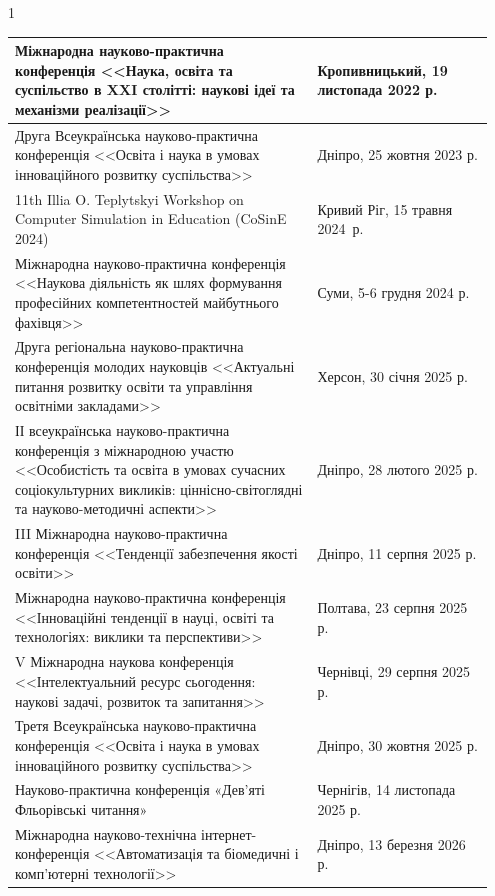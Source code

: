 \begin{center}
\begin{spacing}{1}
\begin{longtable}{|p{0.6\linewidth}|p{0.35\linewidth}|}
Міжнародна науково-практична конференція <<Наука, освіта та суспільство в XXI столітті: наукові ідеї та механізми реалізації>>
 & Кропивницький,
 19 листопада 2022 р. \\\hline

Друга Всеукраїнська науково-практична конференція <<Освіта і наука в умовах інноваційного розвитку суспільства>> &  Дніпро, 25 жовтня 2023 р.\\\hline

11th Illia O. Teplytskyi Workshop on Computer Simulation in Education (CoSinE 2024) & Кривий Ріг, 15 травня 2024~р. \\\hline

Міжнародна науково-практична конференція <<Наукова діяльність як шлях формування професійних компетентностей майбутнього фахівця>> & Суми,  5-6 грудня 2024 р.\\\hline

Друга регіональна науково-практична конференція молодих науковців <<Актуальні питання розвитку освіти та управління освітніми закладами>> & Херсон, 30 січня 2025 р. \\\hline

ІІ всеукраїнська науково-практична конференція з міжнародною
участю <<Особистість та освіта в умовах сучасних соціокультурних викликів:
ціннісно-світоглядні та науково-методичні аспекти>>
& Дніпро, 28 лютого 2025 р.\\\hline

III Міжнародна науково-практична
конференція <<Тенденції забезпечення якості освіти>>  &  Дніпро, 11 серпня 2025 р.\\\hline

Міжнародна науково-практична конференція <<Інноваційні тенденції в науці, освіті та технологіях: виклики та перспективи>> & Полтава,
 23 серпня 2025 р.\\\hline

V Міжнародна  наукова конференція <<Інтелектуальний ресурс сьогодення: наукові задачі, розвиток та  запитання>> &  Чернівці, 29 серпня 2025 р.\\\hline

Третя Всеукраїнська науково-практична конференція <<Освіта і наука в умовах інноваційного розвитку суспільства>> &  Дніпро, 30 жовтня 2025 р.\\\hline

Науково-практична конференція «Дев’яті Фльорівські
читання» & Чернігів, 14 листопада 2025 р. \\\hline

Міжнародна науково-технічна інтернет-конференція <<Автоматизація та біомедичні і комп’ютерні технології>>
 & Дніпро, 13 березня
 2026 р. \\\hline

\end{longtable}

\end{spacing}
\end{center}


